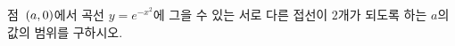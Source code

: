 점~$(a{,}\mkern3mu\mathopen{}0)$에서 곡선 $y=e^{-x^2}$에 그을 수 있는 서로 다른 접선이 $2$개가 되도록 하는 $a$의 값의 범위를 구하시오.
